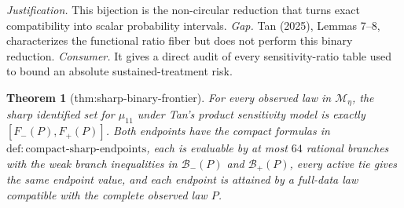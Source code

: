 \documentclass{article}
\newtheorem{theorem}{Theorem}
\begin{document}
\par\smallskip\noindent \textit{Justification.} This bijection is the non-circular reduction that turns exact compatibility into scalar probability intervals. \textit{Gap.} Tan (2025), Lemmas 7--8, characterizes the functional ratio fiber but does not perform this binary reduction. \textit{Consumer.} It gives a direct audit of every sensitivity-ratio table used to bound an absolute sustained-treatment risk.

\begin{theorem}[thm:sharp-binary-frontier]\label{thm:sharp-binary-frontier}
For every observed law in \(\mathcal M_\eta\), the sharp identified set for \(\mu_{11}\) under Tan's product sensitivity model is exactly \([F_-(P),F_+(P)]\). Both endpoints have the compact formulas in \(\mathrm{def{:}compact\text{-}sharp\text{-}endpoints}\), each is evaluable by at most \(64\) rational branches with the weak branch inequalities in \(\mathcal B_-(P)\) and \(\mathcal B_+(P)\), every active tie gives the same endpoint value, and each endpoint is attained by a full-data law compatible with the complete observed law \(P\).
\end{theorem}
\end{document}
